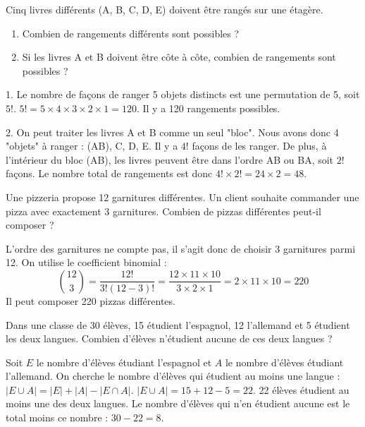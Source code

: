 \begin{exercicebox}[Permutations]
Cinq livres différents (A, B, C, D, E) doivent être rangés sur une étagère.
\begin{enumerate}
    \item Combien de rangements différents sont possibles ?
    \item Si les livres A et B doivent être côte à côte, combien de rangements sont possibles ?
\end{enumerate}
\end{exercicebox}

\begin{correctionbox}
1. Le nombre de façons de ranger 5 objets distincts est une permutation de 5, soit $5!$.
$5! = 5 \times 4 \times 3 \times 2 \times 1 = 120$. Il y a 120 rangements possibles.

2. On peut traiter les livres A et B comme un seul "bloc". Nous avons donc 4 "objets" à ranger : (AB), C, D, E. Il y a $4!$ façons de les ranger.
De plus, à l'intérieur du bloc (AB), les livres peuvent être dans l'ordre AB ou BA, soit $2!$ façons.
Le nombre total de rangements est donc $4! \times 2! = 24 \times 2 = 48$.
\end{correctionbox}

\begin{exercicebox}
Une pizzeria propose 12 garnitures différentes. Un client souhaite commander une pizza avec exactement 3 garnitures. Combien de pizzas différentes peut-il composer ?
\end{exercicebox}

\begin{correctionbox}
L'ordre des garnitures ne compte pas, il s'agit donc de choisir 3 garnitures parmi 12. On utilise le coefficient binomial :
$$ \binom{12}{3} = \frac{12!}{3!(12-3)!} = \frac{12 \times 11 \times 10}{3 \times 2 \times 1} = 2 \times 11 \times 10 = 220 $$
Il peut composer 220 pizzas différentes.
\end{correctionbox}

\begin{exercicebox}
Dans une classe de 30 élèves, 15 étudient l'espagnol, 12 l'allemand et 5 étudient les deux langues. Combien d'élèves n'étudient aucune de ces deux langues ?
\end{exercicebox}

\begin{correctionbox}
Soit $E$ le nombre d'élèves étudiant l'espagnol et $A$ le nombre d'élèves étudiant l'allemand.
On cherche le nombre d'élèves qui étudient au moins une langue : $|E \cup A| = |E| + |A| - |E \cap A|$.
$|E \cup A| = 15 + 12 - 5 = 22$.
22 élèves étudient au moins une des deux langues.
Le nombre d'élèves qui n'en étudient aucune est le total moins ce nombre : $30 - 22 = 8$.
\end{correctionbox}

